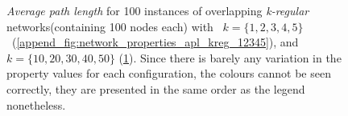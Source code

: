 \begin{figure}[H]
\begin{subfigure}{.49\linewidth}
 \caption{}
 \label{append_fig:network_properties_apl_kreg_1020304050}
\end{subfigure}
\begin{minipage}{0.9\linewidth}
\vspace{0.2cm}
\caption{\textit{Average path length} for 100 instances of overlapping \textit{k-regular} networks(containing 100 nodes each) with ~$k=\{1,2,3,4,5\}$~(\ref{append_fig:network_properties_apl_kreg_12345}), and  $k= \{10,20,30,40,50\}$ (\ref{append_fig:network_properties_apl_kreg_1020304050}). Since there is barely any variation in the property values for each configuration, the colours cannot be seen correctly, they are presented in the same order as the legend nonetheless.}
\label{append_fig:network_properties_apl_kreg}
\end{minipage}

\end{figure}

